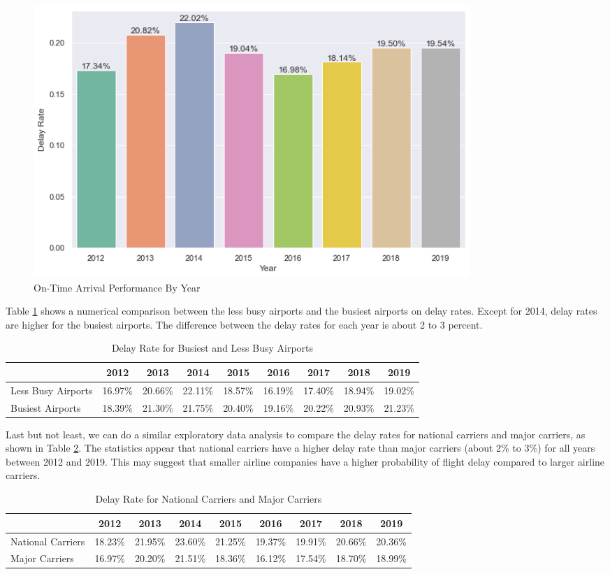 \documentclass[11pt, letterpaper]{article}
\begin{document}
\begin{figure}[h!]
\centering
\includegraphics[width = 0.8\textwidth]{bar_plot2}
\caption{On-Time Arrival Performance By Year}\label{fig:bar_plot2}
\end{figure}

Table \ref{tab:busy} shows a numerical comparison between the less busy airports and the busiest airports on delay rates. Except for 2014, delay rates are higher for the busiest airports. The difference between the delay rates for each year is about 2 to 3 percent.

\begin{table}[h!]
\centering
\begin{tabular}{lcccccccc}
             & 2012 & 2013 & 2014 & 2015 & 2016 & 2017 & 2018 & 2019 \\ 
\hline
 Less Busy Airports & 16.97\% & 20.66\% & 22.11\% & 18.57\% & 16.19\% & 17.40\% & 18.94\% & 19.02\% \\  
 Busiest Airports & 18.39\% & 21.30\% & 21.75\% & 20.40\% & 19.16\% & 20.22\% & 20.93\% & 21.23\% \\
\end{tabular}\caption{Delay Rate for Busiest and Less Busy Airports}\label{tab:busy}
\end{table}

Last but not least, we can do a similar exploratory data analysis to compare the delay rates for national carriers and major carriers, as shown in Table \ref{tab:carrier}. The statistics appear that national carriers have a higher delay rate than major carriers (about 2\% to 3\%) for all years between 2012 and 2019. This may suggest that smaller airline companies have a higher probability of flight delay compared to larger airline carriers.

\begin{table}[h!]
\centering
\begin{tabular}{lcccccccc}
             & 2012 & 2013 & 2014 & 2015 & 2016 & 2017 & 2018 & 2019 \\ 
\hline
 National Carriers & 18.23\% & 21.95\% & 23.60\% & 21.25\% & 19.37\% & 19.91\% & 20.66\% & 20.36\% \\  
 Major Carriers & 16.97\% & 20.20\% & 21.51\% & 18.36\% & 16.12\% & 17.54\% & 18.70\% & 18.99\% \\
\end{tabular}\caption{Delay Rate for National Carriers and Major Carriers}\label{tab:carrier}
\end{table}



\end{document}
